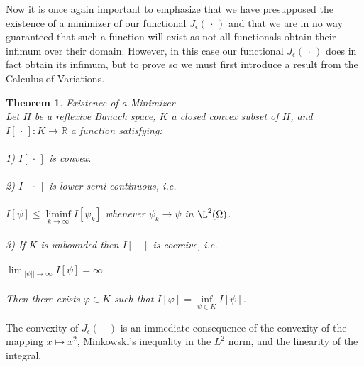 \documentclass[11pt]{article}
\newcommand\tab[1][1cm]{\hspace*{#1}}
\newtheorem{theorem}{Theorem}
\begin{document}
Now it is once again important to emphasize that we have presupposed the existence of a minimizer of our functional $J_\epsilon (\,\cdot\,)$ and that we are in no way guaranteed that such a function will exist as not all functionals obtain their infimum over their domain. However, in this case our functional $J_\epsilon (\,\cdot\,)$ does in fact obtain its infimum, but to prove so we must first introduce a result from the Calculus of Variations.

\begin{theorem}{Existence of a Minimizer}
\\Let $H$ be a reflexive Banach space, $K$ a closed convex subset of $H$, and $I\left[\,\cdot\,\right]:K\rightarrow\mathbb{R}$ a function satisfying:\\\\
\tab 1) $I\left[\,\cdot\,\right]$ is convex.\\\\
\tab 2) $I\left[\,\cdot\,\right]$ is lower semi-continuous, i.e.\\\\
\tab\tab $I\left[\psi\right] \leq\liminf\limits_{k\rightarrow\infty}I\left[\psi_k\right]$ whenever $\psi_k \rightarrow \psi$ in $\L^2(\Omega)$.\\\\
\tab 3) If $K$ is unbounded then $I\left[\,\cdot\,\right]$ is coercive, i.e.\\\\
\tab\tab $\lim_{\lvert\lvert\psi\rvert\rvert\to\infty} I\left[\psi\right] =\infty$\\
\\Then there exists $\varphi\in K$ such that $I\left[\varphi\right]=\inf\limits_{\psi\in K}I\left[\psi\right]$.
\end{theorem}

The convexity of $J_\epsilon (\,\cdot\,)$ is an immediate consequence of the convexity of the mapping $x \mapsto x^2$, Minkowski's inequality in the $L^2$ norm, and the linearity of the integral.
\end{document}
